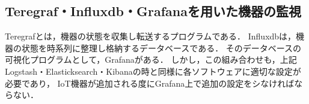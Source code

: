 \subsection{Teregraf・Influxdb・Grafanaを用いた機器の監視}
	Teregrafとは，機器の状態を収集し転送するプログラムである．
	Influxdbは，機器の状態を時系列に整理し格納するデータベースである．
	そのデータベースの可視化プログラムとして，Grafanaがある．
	しかし，この組み合わせも，上記Logstash・Elasticksearch・Kibanaの時と同様に各ソフトウェアに適切な設定が必要であり，
	IoT機器が追加される度にGrafana上で追加の設定をシなければならない．

